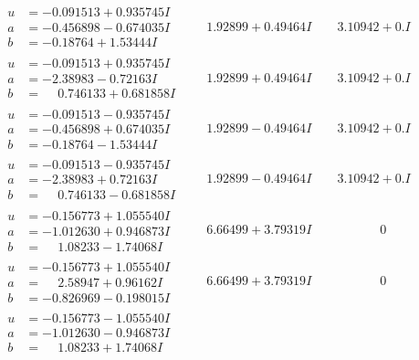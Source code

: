 \documentclass[1p]{elsarticle_modified}
\theoremstyle{definition}
\begin{document}
$$\begin{array}{c|c|c}
\begin{aligned}
u &= -0.091513 + 0.935745 I \\
a &= -0.456898 - 0.674035 I \\
b &= -0.18764 + 1.53444 I\end{aligned}
 & \phantom{-}1.92899 + 0.49464 I & \phantom{-}3.10942 + 0. I\phantom{ +0.000000I} \\ \hline\begin{aligned}
u &= -0.091513 + 0.935745 I \\
a &= -2.38983 - 0.72163 I \\
b &= \phantom{-}0.746133 + 0.681858 I\end{aligned}
 & \phantom{-}1.92899 + 0.49464 I & \phantom{-}3.10942 + 0. I\phantom{ +0.000000I} \\ \hline\begin{aligned}
u &= -0.091513 - 0.935745 I \\
a &= -0.456898 + 0.674035 I \\
b &= -0.18764 - 1.53444 I\end{aligned}
 & \phantom{-}1.92899 - 0.49464 I & \phantom{-}3.10942 + 0. I\phantom{ +0.000000I} \\ \hline\begin{aligned}
u &= -0.091513 - 0.935745 I \\
a &= -2.38983 + 0.72163 I \\
b &= \phantom{-}0.746133 - 0.681858 I\end{aligned}
 & \phantom{-}1.92899 - 0.49464 I & \phantom{-}3.10942 + 0. I\phantom{ +0.000000I} \\ \hline\begin{aligned}
u &= -0.156773 + 1.055540 I \\
a &= -1.012630 + 0.946873 I \\
b &= \phantom{-}1.08233 - 1.74068 I\end{aligned}
 & \phantom{-}6.66499 + 3.79319 I & \phantom{-0.000000 } 0 \\ \hline\begin{aligned}
u &= -0.156773 + 1.055540 I \\
a &= \phantom{-}2.58947 + 0.96162 I \\
b &= -0.826969 - 0.198015 I\end{aligned}
 & \phantom{-}6.66499 + 3.79319 I & \phantom{-0.000000 } 0 \\ \hline\begin{aligned}
u &= -0.156773 - 1.055540 I \\
a &= -1.012630 - 0.946873 I \\
b &= \phantom{-}1.08233 + 1.74068 I\end{aligned}

\end{array}$$
\end{document}
